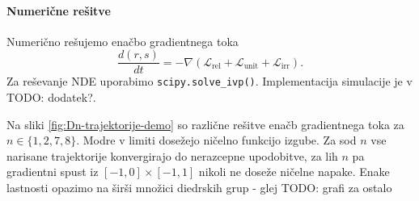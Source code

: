 \documentclass[mat2, tisk]{fmfdelo}
\newcommand{\TODO}[1]{{\color{blue} TODO: #1}}
\newcommand{\Loss}[1]{\mathcal L _\text{#1}}
\begin{document}
        \paragraph{Numerične rešitve}
        Numerično rešujemo enačbo gradientnega toka 
        $$\frac{d(r,s)}{dt} = -\nabla(\Loss{rel} + \Loss{unit} + \Loss{irr}).$$ Za reševanje NDE uporabimo \verb|scipy.solve_ivp()|. Implementacija simulacije je v \TODO{dodatek?}. 

        Na sliki \ref{fig:Dn-trajektorije-demo} so različne rešitve enačb gradientnega toka za $n\in \{1,2,7,8\}$. Modre v limiti dosežejo ničelno funkcijo izgube. Za sod $n$ vse narisane trajektorije konvergirajo do nerazcepne upodobitve, za lih $n$ pa gradientni spust iz $[-1,0]\times[-1,1]$ nikoli ne doseže ničelne napake. Enake lastnosti opazimo na širši množici diedrskih grup - glej \TODO{grafi za ostalo} 
        
\end{document}
